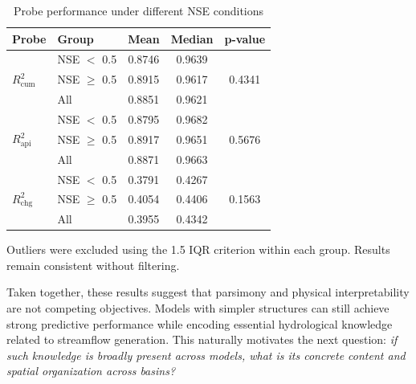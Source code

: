 \begin{table}[htbp]
    \centering
    \begin{threeparttable}
        \caption{Probe performance under different NSE conditions}
        \begin{tabular*}{\textwidth}{@{\extracolsep{\fill}}llccc}
            \toprule
            Probe & Group & Mean & Median & p-value \\
            \midrule

            \multirow{3}{*}{$R^2_{\mathrm{cum}}$}
            & NSE $<$ 0.5    & 0.8746 & 0.9639 & \multirow{3}{*}{0.4341} \\
            & NSE $\geq$ 0.5 & 0.8915 & 0.9617 & \\
            & All            & 0.8851 & 0.9621 & \\

            \midrule

            \multirow{3}{*}{$R^2_{\mathrm{api}}$}
            & NSE $<$ 0.5    & 0.8795 & 0.9682 & \multirow{3}{*}{0.5676} \\
            & NSE $\geq$ 0.5 & 0.8917 & 0.9651 & \\
            & All            & 0.8871 & 0.9663 & \\

            \midrule

            \multirow{3}{*}{$R^2_{\mathrm{chg}}$}
            & NSE $<$ 0.5    & 0.3791 & 0.4267 & \multirow{3}{*}{0.1563} \\
            & NSE $\geq$ 0.5 & 0.4054 & 0.4406 & \\
            & All            & 0.3955 & 0.4342 & \\

            \bottomrule
        \end{tabular*}

        \begin{tablenotes}
            \footnotesize
            \item Outliers were excluded using the 1.5 IQR criterion within each group. Results remain consistent without filtering.
        \end{tablenotes}
        \label{tab:probe}
    \end{threeparttable}
\end{table}

Taken together, these results suggest that parsimony and physical interpretability are not competing objectives. Models with simpler structures can still achieve strong predictive performance while encoding essential hydrological knowledge related to streamflow generation. This naturally motivates the next question: \textit{if such knowledge is broadly present across models, what is its concrete content and spatial organization across basins?}

